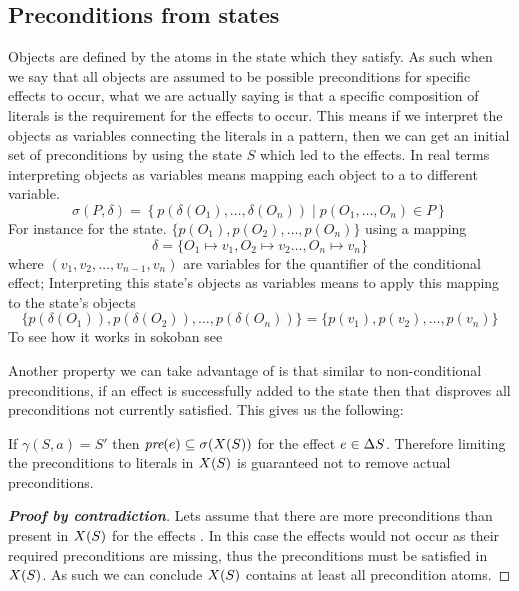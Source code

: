 \documentclass[\master/Master.tex]{subfiles}
\begin{document}
\subsection{Preconditions from states}
Objects are defined by the atoms in the state which they satisfy. As such when we say that all objects are assumed to be possible preconditions for specific effects to occur, what we are actually saying is that a specific composition of literals is the requirement for the effects to occur.
This means if we interpret the objects as variables connecting the literals in a pattern, then we can get an initial set of preconditions by using the state $S$ which led to the effects. In real terms interpreting objects as variables means mapping each object 
to a to different variable.
\begin{equation}\label{eq:ca:substitution}
	\sigma(P,\delta) =  \left\{p\left(\delta(O_1),\ldots,\delta(O_n) \right) \mid p(O_1,\ldots,O_n) \in P  \right\}
\end{equation}
For instance for the state.
$\{ p(O_1), p(O_2),\ldots,p(O_n)\}$ using a mapping
\begin{equation*}
\delta = \{O_1 \mapsto v_1, O_2 \mapsto v_2 \ldots, O_n \mapsto v_n\}
\end{equation*}
where $(v_1, v_2,\dots,v_{n-1},v_n)$ are variables for the quantifier of the conditional effect; Interpreting this state's objects as variables means to apply this mapping to the state's objects
\begin{equation*}
\{ p(\delta(O_1)), p(\delta(O_2)),\ldots,p(\delta(O_n))\} = \{ p(v_1), p(v_2),\ldots,p(v_n)\}
\end{equation*}
To see how it works in sokoban see 

Another property we can take advantage of is that similar to non-conditional preconditions, if an effect is successfully added to the state then that disproves all preconditions not currently satisfied.
This gives us the following:

\begin{theorem}\label{thm:ca:precondition-state}
If $\gamma (S,a) = S'$ then $\textit{pre}(e) \subseteq \sigma(X(S))$  for the effect $e \in \Delta S$.
Therefore limiting the preconditions to literals in $X(S)$ is guaranteed not to remove actual preconditions.
\end{theorem}
\begin{proof}[\textbf{Proof by contradiction}] Lets assume that there are more preconditions than present in $X(S)$ for the effects \geffects.
	In this case the effects would not occur as their required preconditions are missing, thus the preconditions must be satisfied in $X(S)$.
	As such we can conclude $X(S)$ contains at least all precondition atoms.
\end{proof}
\end{document}
